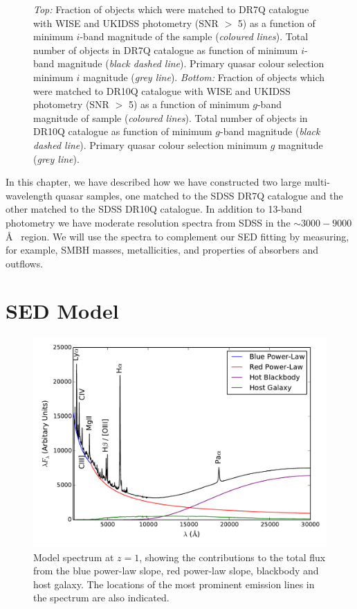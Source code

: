 \begin{figure}
\begin{minipage}[b]{0.75\textwidth}
  \end{minipage}
  \caption{{\it Top:} Fraction of objects which were matched to DR7Q catalogue with WISE and UKIDSS photometry (SNR $>$ 5) as a function of minimum $i$-band magnitude of the sample ({\it coloured lines}). Total number of objects in DR7Q catalogue as function of minimum $i$-band magnitude ({\it black dashed line}). Primary quasar colour selection minimum $i$ magnitude ({\it grey line}). {\it Bottom:} Fraction of objects which were matched to DR10Q catalogue with WISE and UKIDSS photometry (SNR $>$ 5) as a function of minimum $g$-band magnitude of sample ({\it coloured lines}). Total number of objects in DR10Q catalogue as function of minimum $g$-band magnitude ({\it black dashed line}). Primary quasar colour selection minimum $g$ magnitude ({\it grey line}).}
  \label{fig:completeness}
\end{figure}

In this chapter, we have described how we have constructed two large multi-wavelength quasar samples, one matched to the SDSS DR7Q catalogue and the other matched to the SDSS DR10Q catalogue. In addition to 13-band photometry we have moderate resolution spectra from SDSS in the $\sim 3000 - 9000$\AA~ region. We will use the spectra to complement our SED fitting by measuring, for example, SMBH masses, metallicities, and properties of absorbers and outflows.  

\newpage

\section{SED Model}
\label{chapter:sedmodel}

\begin{figure}[h]
  \centering
  \includegraphics[width=\textwidth]{figures/chapter06/modelsed}
  \caption{Model spectrum at $z=1$, showing the contributions to the total flux from the blue power-law slope, red power-law slope, blackbody and host galaxy. The locations of the most prominent emission lines in the spectrum are also indicated. }
  \label{fig:modelsed}
\end{figure}

